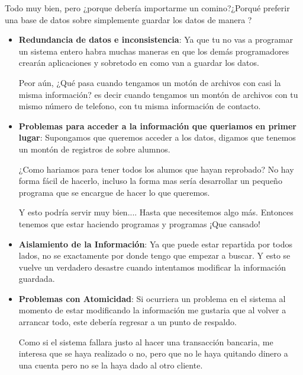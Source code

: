 \documentclass[12pt, fleqn]{report}                             %
\newcommand \Quote {\qq}                                        %
\begin{document}
            Todo muy bien, pero ¿porque debería importarme un comino?¿Porqué preferir una base de datos
            sobre simplemente guardar los datos de manera \Quote{común}?
            \begin{itemize}
                \item
                    \textbf{Redundancia de datos e inconsistencia}:
                        Ya que tu no vas a programar un sistema entero habra muchas maneras
                        en que los demás programadores crearán aplicaciones y sobretodo en como
                        van a guardar los datos.

                        Peor aún, ¿Qué pasa cuando tengamos un motón de archivos con casi la misma información?
                        es decir cuando tengamos un montón de archivos con tu mismo número de telefono,
                        con tu misma información de contacto. 

                \item
                    \textbf{Problemas para acceder a la información que queriamos en primer lugar}:
                        Supongamos que queremos acceder a los datos, digamos que tenemos un montón
                        de registros de sobre alumnos.

                        ¿Como hariamos para tener todos los alumos que hayan reprobado?
                        No hay forma fácil de hacerlo, incluso la forma mas \Quote{correcta} sería
                        desarrollar un pequeño programa que se encargue de hacer lo que queremos.

                        Y esto podría servir muy bien.... Hasta que necesitemos algo más.
                        Entonces tenemos que estar haciendo programas y programas ¡Que cansado!

                \clearpage
                \item
                    \textbf{Aislamiento de la Información}:
                        Ya que puede estar repartida por todos lados, no se exactamente por donde tengo
                        que empezar a buscar. Y esto se vuelve un verdadero desastre cuando intentamos
                        modificar la información guardada.


                \item
                    \textbf{Problemas con Atomicidad}:
                        Si ocurriera un problema en el sistema al momento de estar modificando la información
                        me gustaria que al volver a arrancar todo, este debería regresar a un punto de
                        respaldo.

                        Como si el sistema fallara justo al hacer una transacción bancaria, me interesa que 
                        se haya realizado o no, pero que no le haya quitando dinero a una cuenta pero no se la
                        haya dado al otro cliente. 

            \end{itemize}
\end{document}
